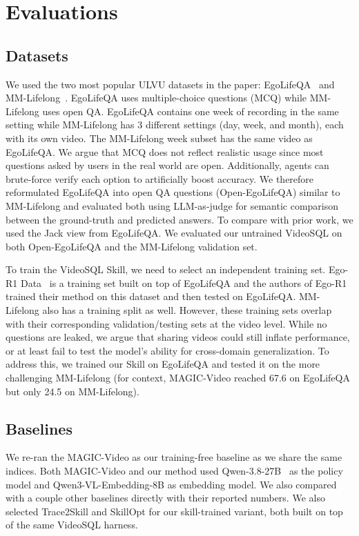 \section{Evaluations}

\subsection{Datasets}
We used the two most popular ULVU datasets in the paper: EgoLifeQA~\cite{yang_egolife_2026} and MM-Lifelong~\cite{chen_multimodal_2026}. EgoLifeQA uses multiple-choice questions (MCQ) while MM-Lifelong uses open QA. EgoLifeQA contains one week of recording in the same setting while MM-Lifelong has 3 different settings (day, week, and month), each with its own video. The MM-Lifelong week subset has the same video as EgoLifeQA. We argue that MCQ does not reflect realistic usage since most questions asked by users in the real world are open. Additionally, agents can brute-force verify each option to artificially boost accuracy. We therefore reformulated EgoLifeQA into open QA questions (Open-EgoLifeQA) similar to MM-Lifelong and evaluated both using LLM-as-judge for semantic comparison between the ground-truth and predicted answers. To compare with prior work, we used the Jack view from EgoLifeQA. We evaluated our untrained VideoSQL on both Open-EgoLifeQA and the MM-Lifelong validation set.

To train the VideoSQL Skill, we need to select an independent training set. Ego-R1 Data~\cite{tian_egor1_2025} is a training set built on top of EgoLifeQA and the authors of Ego-R1 trained their method on this dataset and then tested on EgoLifeQA. MM-Lifelong also has a training split as well. However, these training sets overlap with their corresponding validation/testing sets at the video level. While no questions are leaked, we argue that sharing videos could still inflate performance, or at least fail to test the model's ability for cross-domain generalization. To address this, we trained our Skill on EgoLifeQA and tested it on the more challenging MM-Lifelong (for context, MAGIC-Video reached 67.6 on EgoLifeQA but only 24.5 on MM-Lifelong).


\subsection{Baselines}
We re-ran the MAGIC-Video \cite{li_bridging_2026} as our training-free baseline as we share the same indices. Both MAGIC-Video and our method used Qwen-3.8-27B~\cite{qwen38} as the policy model and Qwen3-VL-Embedding-8B \cite{li_qwen3vlembedding_2026} as embedding model. We also compared with a couple other baselines directly with their reported numbers. We also selected Trace2Skill \cite{ni_trace2skill_2026} and SkillOpt \cite{yang_skillopt_2026} for our skill-trained variant, both built on top of the same VideoSQL harness.

